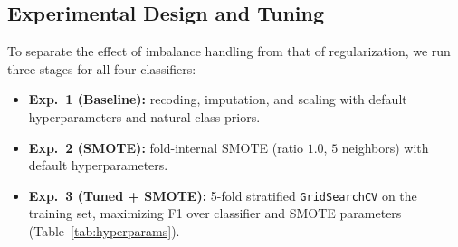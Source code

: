 \documentclass[journal]{IEEEtran}
\begin{document}
\subsection{Experimental Design and Tuning}
To separate the effect of imbalance handling from that of regularization, we run three stages for all four classifiers:
\begin{itemize}
    \item \textbf{Exp.~1 (Baseline):} recoding, imputation, and scaling with default hyperparameters and natural class priors.
    \item \textbf{Exp.~2 (SMOTE):} fold-internal SMOTE (ratio $1.0$, $5$ neighbors) with default hyperparameters.
    \item \textbf{Exp.~3 (Tuned + SMOTE):} 5-fold stratified \texttt{GridSearchCV} on the training set, maximizing F1 over classifier and SMOTE parameters (Table~\ref{tab:hyperparams}).
\end{itemize}
\end{document}
